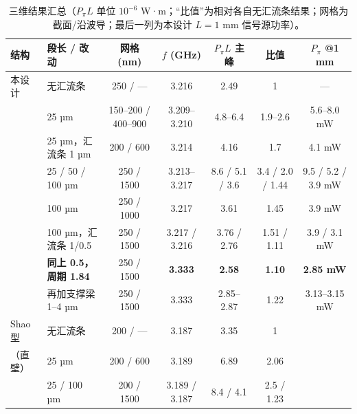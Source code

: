 \documentclass[10pt,a4paper]{article}
\begin{document}
\begin{table}[h]
\centering\footnotesize\setlength{\tabcolsep}{3.5pt}
\caption{三维结果汇总（$P_\pi L$ 单位 $10^{-6}$ W·m；“比值”为相对各自无汇流条结果；网格为截面/沿波导；最后一列为本设计 $L = 1$ mm 信号源功率）。}\label{tab:3d}
\begin{tabular}{llccccc}
\toprule
结构 & 段长 / 改动 & 网格 (nm) & $f$ (GHz) & $P_\pi L$ 主峰 & 比值 & $P_\pi$ @1 mm \\
\midrule
本设计 & 无汇流条 & 250 / — & 3.216 & 2.49 & 1 & — \\
       & 25 µm & 150--200 / 400--900 & 3.209--3.210 & 4.8--6.4 & 1.9--2.6 & 5.6--8.0 mW \\
       & 25 µm，汇流条 1 µm & 200 / 600 & 3.214 & 4.16 & 1.7 & 4.1 mW \\
       & 25 / 50 / 100 µm & 250 / 1500 & 3.213--3.217 & 8.6 / 5.1 / 3.6 & 3.4 / 2.0 / 1.44 & 9.5 / 5.2 / 3.9 mW \\
       & 100 µm & 250 / 1000 & 3.217 & 3.61 & 1.45 & 3.9 mW \\
       & 100 µm，汇流条 1/0.5 & 250 / 1500 & 3.217 / 3.216 & 3.76 / 2.76 & 1.51 / 1.11 & 3.9 / 3.1 mW \\
       & \textbf{同上 0.5，周期 1.84} & 250 / 1500 & \textbf{3.333} & \textbf{2.58} & \textbf{1.10} & \textbf{2.85 mW} \\
       & 再加支撑梁 1--4 µm & 250 / 1500 & 3.333 & 2.85--2.87 & 1.22 & 3.13--3.15 mW \\
\midrule
Shao 型 & 无汇流条 & 200 / — & 3.187 & 3.35 & 1 & \\
（直壁）& 25 µm & 200 / 600 & 3.189 & 6.89 & 2.06 & \\
        & 25 / 100 µm & 200 / 1500 & 3.189 / 3.187 & 8.4 / 4.1 & 2.5 / 1.23 & \\
\bottomrule
\end{tabular}
\end{table}
\end{document}
